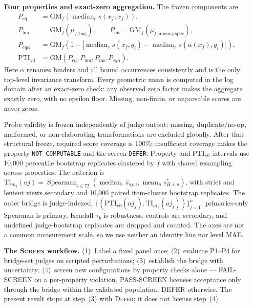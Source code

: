 \documentclass{article}
\newcommand{\TI}{\mathrm{TI}}                    %
\newcommand{\PTI}{\mathrm{PTI}}                  %
\newcommand{\TIm}[1]{\TI_{m_{#1}}}
\newcommand{\PTIvzero}{\PTI_{\mathrm{v0}}}        %
\newcommand{\GM}{\mathrm{GM}}
\begin{document}
\textbf{Four properties and exact-zero aggregation.}
The frozen components are
\begin{align}
P_{\mathrm{eq}} &= \GM_f\!\left(\operatorname{median}_r s(x_f,x_f)\right),\\
P_{\mathrm{bm}} &= \GM_f(\mu_{f,\mathrm{bug}}),\qquad
P_{\mathrm{ms}} = \GM_f(\mu_{f,\mathrm{missing\ spec}}),\\
P_{\mathrm{eq}\alpha} &= \GM_f\!\left(1-\left|\operatorname{median}_r s(x_f,g_i)-\operatorname{median}_r s(\alpha(x_f),g_i)\right|\right),\\
\PTIvzero &= \GM(P_{\mathrm{eq}},P_{\mathrm{bm}},P_{\mathrm{ms}},P_{\mathrm{eq}\alpha}).
\label{eq:pti-v0}
\end{align}
Here $\alpha$ renames binders and all bound occurrences consistently and is the only top-level invariance transform. Every geometric mean is computed in the log domain after an exact-zero check: any observed zero factor makes the aggregate exactly zero, with no epsilon floor. Missing, non-finite, or unparsable scores are never zeros.

Probe validity is frozen independently of judge output: missing, duplicate/no-op, malformed, or non-elaborating transformations are excluded globally. After that structural freeze, required score coverage is 100\%; insufficient coverage makes the property \texttt{NOT\_COMPUTABLE} and the screen \texttt{DEFER}. Property and $\PTIvzero$ intervals use 10,000 percentile bootstrap replicates clustered by $f$ with shared resampling across properties. The criterion is
$\TIm{1}(aj)=\operatorname{Spearman}_{i\in72}(\operatorname{median}_r\hat s_{aj,i},\operatorname{mean}_u s^*_{H,i,u})$, with strict and lenient views secondary and 10,000 paired item-cluster bootstrap replicates.
The outer bridge is judge-indexed, $\{(\PTIvzero(aj_j),\TIm{1}(aj_j))\}_{j=1}^{n}$: primaries-only Spearman is primary, Kendall $\tau_b$ is robustness, controls are secondary, and undefined judge-bootstrap replicates are dropped and counted. The axes are not a common measurement scale, so we use neither an identity line nor level MAE.

\textbf{The \textsc{Screen} workflow.}
(1)~Label a fixed panel once; (2)~evaluate P1--P4 for bridge-set judges on scripted perturbations; (3)~establish the bridge with uncertainty; (4)~screen new configurations by property checks alone --- FAIL-SCREEN on a per-property violation, PASS-SCREEN licenses acceptance only through the bridge within the validated population, DEFER otherwise. The present result stops at step~(3) with \textsc{Defer}; it does not license step~(4).
\end{document}
